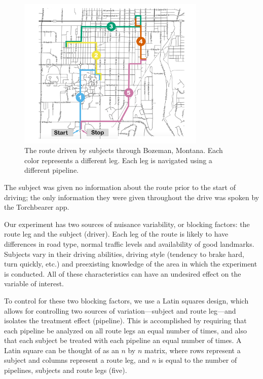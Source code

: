 \begin{figure}[htbp]
  \centering
  \includegraphics[width=0.8\textwidth]{images/route.pdf}
  \caption{The route driven by subjects through Bozeman, Montana. Each color represents a different leg. Each leg is navigated using a different pipeline.}
  \label{fig:route}
\end{figure}

The subject was given no information about the route prior to the start of driving; the only information they were given throughout the drive was spoken by the Torchbearer app. 

Our experiment has two sources of nuisance variability, or blocking factors: the route leg and the subject (driver). Each leg of the route is likely to have differences in road type, normal traffic levels and availability of good landmarks. Subjects vary in their driving abilities, driving style (tendency to brake hard, turn quickly, etc.) and preexisting knowledge of the area in which the experiment is conducted. All of these characteristics can have an undesired effect on the variable of interest. 

To control for these two blocking factors, we use a Latin squares design, which allows for controlling two sources of variation---subject and route leg---and isolates the treatment effect (pipeline). This is accomplished by requiring that each pipeline be analyzed on all route legs an equal number of times, and also that each subject be treated with each pipeline an equal number of times. A Latin square can be thought of as an $n$ by $n$ matrix, where rows represent a subject and columns represent a route leg, and $n$ is equal to the number of pipelines, subjects and route legs (five).

